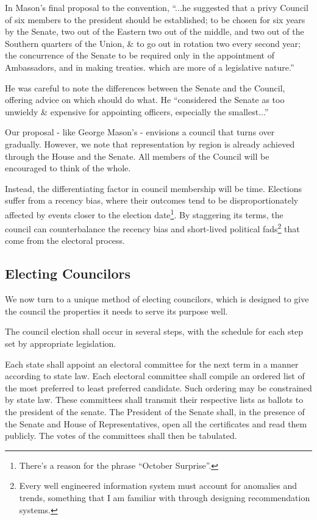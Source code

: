 \documentclass{article}
\newcommand{\quotes}[1]{``#1''}
\begin{document}
In Mason's final proposal to the convention, \quotes{...he suggested that a privy Council of six members to the president should be established; to be chosen for six years by the Senate, two out of the Eastern two out of the middle, and two out of the Southern quarters of the Union, \& to go out in rotation two every second year; the concurrence of the Senate to be required only in the appointment of Ambassadors, and in making treaties. which are more of a legislative nature.}\cite{Madison}

He was careful to note the differences between the Senate and the Council, offering advice on which should do what. He \quotes{considered the Senate as too unwieldy \& expensive for appointing officers, especially the smallest...}

Our proposal - like George Mason's - envisions a council that turns over gradually. However, we note that representation by region is already achieved through the House and the Senate. All members of the Council will be encouraged to think of the whole.

Instead, the differentiating factor in council membership will be time. Elections suffer from a recency bias, where their outcomes tend to be disproportionately affected by events closer to the election date\footnote{There's a reason for the phrase \quotes{October Surprise}.}. By staggering its terms, the council can counterbalance the recency bias and short-lived political fads\footnote{Every well engineered information system must account for anomalies and trends, something that I am familiar with through designing recommendation systems.\cite{Yang}} that come from the electoral process.

\subsection{Electing Councilors}

We now turn to a unique method of electing councilors, which is designed to give the council the properties it needs to serve its purpose well.

\begin{quoting}
The council election shall occur in several steps, with the schedule for each step set by appropriate legislation.

Each state shall appoint an electoral committee for the next term in a manner according to state law. Each electoral committee shall compile an ordered list of the most preferred to least preferred candidate. Such ordering may be constrained by state law. These committees shall transmit their respective lists as ballots to the president of the senate.  The President of the Senate shall, in the presence of the Senate and House of Representatives, open all the certificates and read them publicly. The votes of the committees shall then be tabulated.
\end{quoting}
\end{document}
